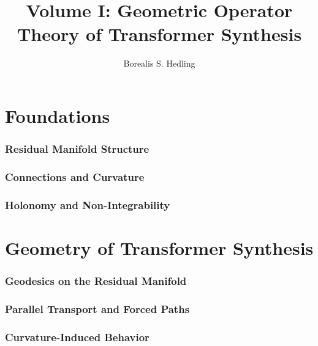 \documentclass[11pt]{article}
\title{Volume I: Geometric Operator Theory of Transformer Synthesis}
\author{Borealis S. Hedling}
\date{}
\begin{document}
\maketitle
\tableofcontents

\part{Foundations}

\section{Residual Manifold Structure}

\section{Connections and Curvature}

\section{Holonomy and Non-Integrability}

\part{Geometry of Transformer Synthesis}

\section{Geodesics on the Residual Manifold}

\section{Parallel Transport and Forced Paths}

\section{Curvature-Induced Behavior}
\end{document}
